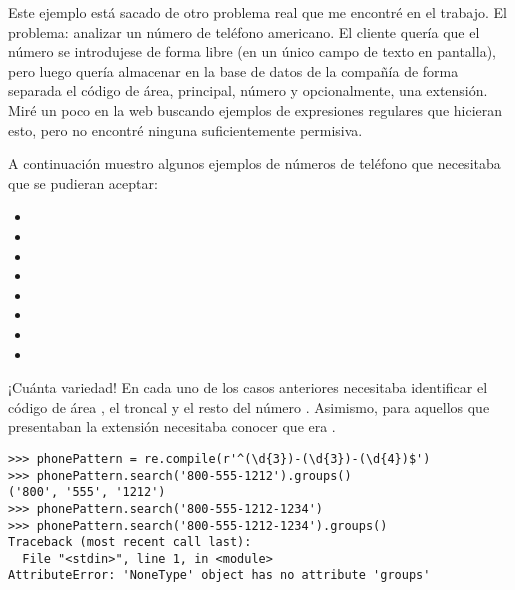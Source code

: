 
Este ejemplo está sacado de otro problema real que me encontré en el trabajo. El problema: analizar un número de teléfono americano. El cliente quería que el número se introdujese de forma libre (en un único campo de texto en pantalla), pero luego quería almacenar en la base de datos de la compañía de forma separada el código de área, principal, número y opcionalmente, una extensión. Miré un poco en la web buscando ejemplos de expresiones regulares que hicieran esto, pero no encontré ninguna suficientemente permisiva.

A continuación muestro algunos ejemplos de números de teléfono que necesitaba que se pudieran aceptar:

\begin{itemize}

\item {}
\item {}
\item {}
\item {}
\item {}
\item {}
\item {}
\item {}

\end{itemize}

¡Cuánta variedad! En cada uno de los casos anteriores necesitaba identificar el código de área , el troncal  y el resto del número . Asimismo, para aquellos que presentaban la extensión necesitaba conocer que era .

\noindent\begin{minipage}{\textwidth}
\begin{lstlisting}[mathescape=False]
>>> phonePattern = re.compile(r'^(\d{3})-(\d{3})-(\d{4})$')
>>> phonePattern.search('800-555-1212').groups()
('800', '555', '1212')
>>> phonePattern.search('800-555-1212-1234')
>>> phonePattern.search('800-555-1212-1234').groups()
Traceback (most recent call last):
  File "<stdin>", line 1, in <module>
AttributeError: 'NoneType' object has no attribute 'groups'
\end{lstlisting}
\end{minipage}

